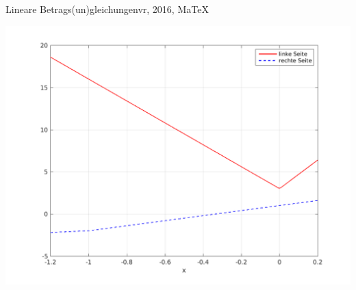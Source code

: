 \begin{MAufgabe}{Lineare Betrags(un)gleichungen}{vr, 2016, MaTeX}
 \begin{center}
 \includegraphics[width=0.8\linewidth]{Abb_zur_Ag_autogenerated_ineq_8.png} \end{center}
 
\else\relax\fi
 \end{MAufgabe}